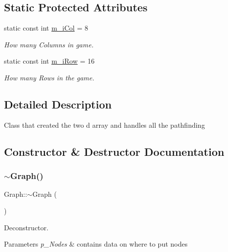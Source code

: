 \subsection*{Static Protected Attributes}
\begin{DoxyCompactItemize}
\item 
static const int \mbox{\hyperlink{class_graph_aaf5b79ca84f573eb07c1b2a0f2baec25}{m\+\_\+i\+Col}} = 8
\begin{DoxyCompactList}\small\item\em How many Columns in game. \end{DoxyCompactList}\item 
\mbox{\label{class_graph_aefa8c02f516b89b5a9e5361f1ba48786}} 
static const int \mbox{\hyperlink{class_graph_aefa8c02f516b89b5a9e5361f1ba48786}{m\+\_\+i\+Row}} = 16
\begin{DoxyCompactList}\small\item\em How many Rows in the game. \end{DoxyCompactList}\end{DoxyCompactItemize}


\subsection{Detailed Description}
Class that created the two d array and handles all the pathfinding 

\subsection{Constructor \& Destructor Documentation}
\mbox{\label{class_graph_a902c5b3eacb66d60752525ab23297a95}} 
\subsubsection{\texorpdfstring{$\sim$\+Graph()}{~Graph()}}
{\footnotesize\ttfamily Graph\+::$\sim$\+Graph (\begin{DoxyParamCaption}{ }\end{DoxyParamCaption})}



Deconstructor. 


\begin{DoxyParams}{Parameters}
{\em p\+\_\+\+Nodes} & contains data on where to put nodes \\
\hline
\end{DoxyParams}


